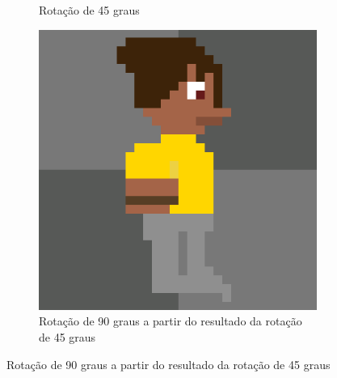 \begin{figure}[htbp]
\begin{subfigure}{0.32\linewidth}
        \caption{\small Rotação de 45 graus}
        \label{fig:pixelLabRot3b}
    \end{subfigure}
    \begin{subfigure}{0.32\linewidth}
        \includegraphics[width=1\linewidth]{figs/pixelLab/dia2/rot90res3.PNG}
        \caption{\small Rotação de 90 graus a partir do resultado da rotação de 45 graus}
        \label{fig:pixelLabRot3c}
    \end{subfigure}
\end{figure}

